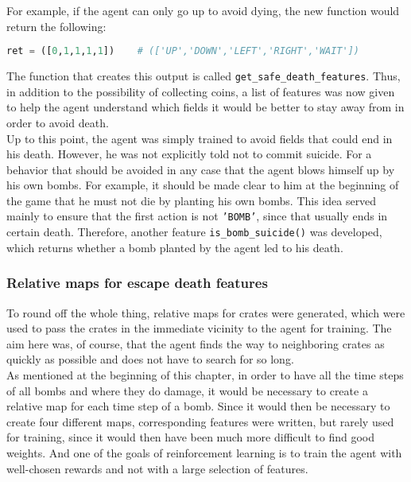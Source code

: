 For example, if the agent can only go up to avoid dying, the new function would return the following:
\vspace{0.1cm}
\begin{lstlisting}[language=python, keywordstyle=\color{black}]
  ret = ([0,1,1,1,1])    # (['UP','DOWN','LEFT','RIGHT','WAIT'])
\end{lstlisting}
\vspace{0.1cm}
The function that creates this output is called \texttt{get\_safe\_death\_features}. Thus, in addition to the possibility of collecting coins, a list of features was now given to help the agent understand which fields it would be better to stay away from in order to avoid death.
\\

Up to this point, the agent was simply trained to avoid fields that could end in his death. However, he was not explicitly told not to commit suicide. For a behavior that should be avoided in any case that the agent blows himself up by his own bombs. For example, it should be made clear to him at the beginning of the game that he must not die by planting his own bombs. This idea served mainly to ensure that the first action is not \texttt{'BOMB'}, since that usually ends in certain death. Therefore, another feature \texttt{is\_bomb\_suicide()} was developed, which returns whether a bomb planted by the agent led to his death.

\subsubsection*{Relative maps for escape death features}
To round off the whole thing, relative maps for crates were generated, which were used to pass the crates in the immediate vicinity to the agent for training. The aim here was, of course, that the agent finds the way to neighboring crates as quickly as possible and does not have to search for so long.
\\

As mentioned at the beginning of this chapter, in order to have all the time steps of all bombs and where they do damage, it would be necessary to create a relative map for each time step of a bomb. Since it would then be necessary to create four different maps, corresponding features were written, but rarely used for training, since it would then have been much more difficult to find good weights. And one of the goals of reinforcement learning is to train the agent with well-chosen rewards and not with a large selection of features.

